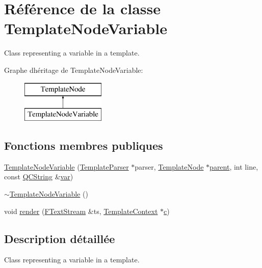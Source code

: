\hypertarget{class_template_node_variable}{}\section{Référence de la classe Template\+Node\+Variable}
\label{class_template_node_variable}


Class representing a variable in a template.  


Graphe d\textquotesingle{}héritage de Template\+Node\+Variable\+:\begin{figure}[H]
\begin{center}
\leavevmode
\includegraphics[height=2.000000cm]{class_template_node_variable}
\end{center}
\end{figure}
\subsection*{Fonctions membres publiques}
\begin{DoxyCompactItemize}
\item 
\hyperlink{class_template_node_variable_a88ef0bf11eea396aabd089bdd84c7ebc}{Template\+Node\+Variable} (\hyperlink{class_template_parser}{Template\+Parser} $\ast$parser, \hyperlink{class_template_node}{Template\+Node} $\ast$\hyperlink{class_template_node_a69a306ef84e62af9fe57bf9aacc94536}{parent}, int line, const \hyperlink{class_q_c_string}{Q\+C\+String} \&\hyperlink{018__def_8c_a335628f2e9085305224b4f9cc6e95ed5}{var})
\item 
\hyperlink{class_template_node_variable_a894e1bbd94af4abc161d2c5f6ef49522}{$\sim$\+Template\+Node\+Variable} ()
\item 
void \hyperlink{class_template_node_variable_add7776f2a65f50b43bbf3802837a5c49}{render} (\hyperlink{class_f_text_stream}{F\+Text\+Stream} \&ts, \hyperlink{class_template_context}{Template\+Context} $\ast$\hyperlink{060__command__switch_8tcl_ab14f56bc3bd7680490ece4ad7815465f}{c})
\end{DoxyCompactItemize}


\subsection{Description détaillée}
Class representing a variable in a template. 

